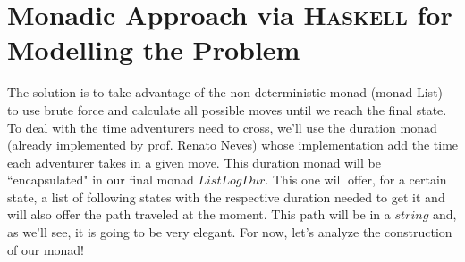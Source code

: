 \documentclass[a4paper]{article}
\def\aspas#1{``#1"}
\newcommand{\Conid}[1]{\mathit{#1}}
\newcommand{\Varid}[1]{\mathit{#1}}
\begin{document}
\section{Monadic Approach via \textsc{Haskell} for Modelling the Problem}
The solution is to take advantage of the non-deterministic monad (monad List) to use brute force and calculate all possible moves until we reach the final state. To deal with the time adventurers need to cross, we'll use the duration monad (already implemented by prof. Renato Neves) whose implementation add the time each adventurer takes in a given move. This duration monad will be \aspas{encapsulated} in our final monad \ensuremath{\Conid{ListLogDur}}. This one will offer, for a certain state, a list of following states with the respective duration needed to get it and will also offer the path traveled at the moment. This path will be in a \ensuremath{\Varid{string}} and, as we'll see, it is going to be very elegant. For now, let's analyze the construction of our monad!
\end{document}
